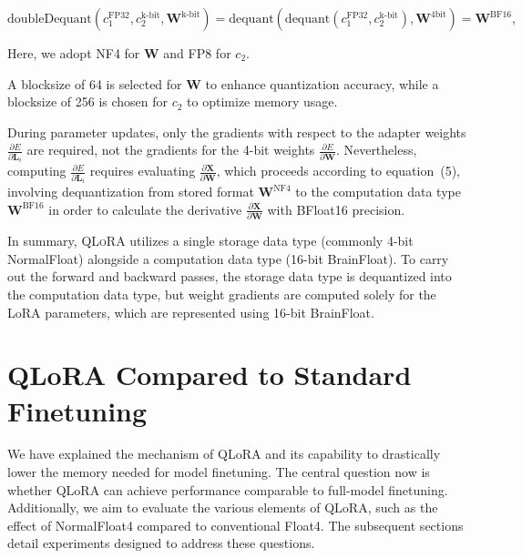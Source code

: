 \begin{equation}
    \text{doubleDequant}(c_1^{\text{FP32}}, c_2^{\text{k-bit}}, \mathbf{W}^{\text{k-bit}}) = \text{dequant}(\text{dequant}(c_1^{\text{FP32}}, c_2^{\text{k-bit}}), \mathbf{W}^{\text{4bit}}) = \mathbf{W}^{\text{BF16}},
\end{equation}

Here, we adopt NF4 for $\mathbf{W}$ and FP8 for $c_2$.

A blocksize of 64 is selected for $\mathbf{W}$ to enhance quantization accuracy, while a blocksize of 256 is chosen for $c_2$ to optimize memory usage.

During parameter updates, only the gradients with respect to the adapter weights $\frac{\partial E}{\partial \mathbf{L}_i}$ are required, not the gradients for the 4-bit weights $\frac{\partial E}{\partial \mathbf{W}}$. Nevertheless, computing $\frac{\partial E}{\partial \mathbf{L}_i}$ requires evaluating $\frac{\partial \mathbf{X}}{\partial \mathbf{W}}$, which proceeds according to equation~(5), involving dequantization from stored format $\mathbf{W}^{\text{NF4}}$ to the computation data type $\mathbf{W}^{\text{BF16}}$ in order to calculate the derivative $\frac{\partial \mathbf{X}}{\partial \mathbf{W}}$ with BFloat16 precision.

In summary, \textsc{QLoRA} utilizes a single storage data type (commonly 4-bit NormalFloat) alongside a computation data type (16-bit BrainFloat). To carry out the forward and backward passes, the storage data type is dequantized into the computation data type, but weight gradients are computed solely for the LoRA parameters, which are represented using 16-bit BrainFloat.

\section{QLoRA Compared to Standard Finetuning}
\label{sec:comp_to_std}

We have explained the mechanism of QLoRA and its capability to drastically lower the memory needed for model finetuning. The central question now is whether QLoRA can achieve performance comparable to full-model finetuning. Additionally, we aim to evaluate the various elements of QLoRA, such as the effect of NormalFloat4 compared to conventional Float4. The subsequent sections detail experiments designed to address these questions.

